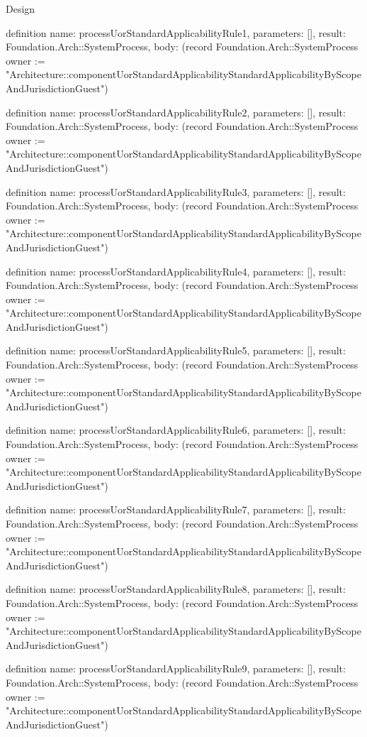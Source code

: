 \begin{lexlean}{Design}
\begin{semanticmodule}
definition{
  name: processUorStandardApplicabilityRule1,
  parameters: [],
  result: Foundation.Arch::SystemProcess,
  body: (record Foundation.Arch::SystemProcess {owner := "Architecture::componentUorStandardApplicabilityStandardApplicabilityByScopeAndJurisdictionGuest"})
}

definition{
  name: processUorStandardApplicabilityRule2,
  parameters: [],
  result: Foundation.Arch::SystemProcess,
  body: (record Foundation.Arch::SystemProcess {owner := "Architecture::componentUorStandardApplicabilityStandardApplicabilityByScopeAndJurisdictionGuest"})
}

definition{
  name: processUorStandardApplicabilityRule3,
  parameters: [],
  result: Foundation.Arch::SystemProcess,
  body: (record Foundation.Arch::SystemProcess {owner := "Architecture::componentUorStandardApplicabilityStandardApplicabilityByScopeAndJurisdictionGuest"})
}

definition{
  name: processUorStandardApplicabilityRule4,
  parameters: [],
  result: Foundation.Arch::SystemProcess,
  body: (record Foundation.Arch::SystemProcess {owner := "Architecture::componentUorStandardApplicabilityStandardApplicabilityByScopeAndJurisdictionGuest"})
}

definition{
  name: processUorStandardApplicabilityRule5,
  parameters: [],
  result: Foundation.Arch::SystemProcess,
  body: (record Foundation.Arch::SystemProcess {owner := "Architecture::componentUorStandardApplicabilityStandardApplicabilityByScopeAndJurisdictionGuest"})
}

definition{
  name: processUorStandardApplicabilityRule6,
  parameters: [],
  result: Foundation.Arch::SystemProcess,
  body: (record Foundation.Arch::SystemProcess {owner := "Architecture::componentUorStandardApplicabilityStandardApplicabilityByScopeAndJurisdictionGuest"})
}

definition{
  name: processUorStandardApplicabilityRule7,
  parameters: [],
  result: Foundation.Arch::SystemProcess,
  body: (record Foundation.Arch::SystemProcess {owner := "Architecture::componentUorStandardApplicabilityStandardApplicabilityByScopeAndJurisdictionGuest"})
}

definition{
  name: processUorStandardApplicabilityRule8,
  parameters: [],
  result: Foundation.Arch::SystemProcess,
  body: (record Foundation.Arch::SystemProcess {owner := "Architecture::componentUorStandardApplicabilityStandardApplicabilityByScopeAndJurisdictionGuest"})
}

definition{
  name: processUorStandardApplicabilityRule9,
  parameters: [],
  result: Foundation.Arch::SystemProcess,
  body: (record Foundation.Arch::SystemProcess {owner := "Architecture::componentUorStandardApplicabilityStandardApplicabilityByScopeAndJurisdictionGuest"})
}


\end{semanticmodule}
\end{lexlean}
